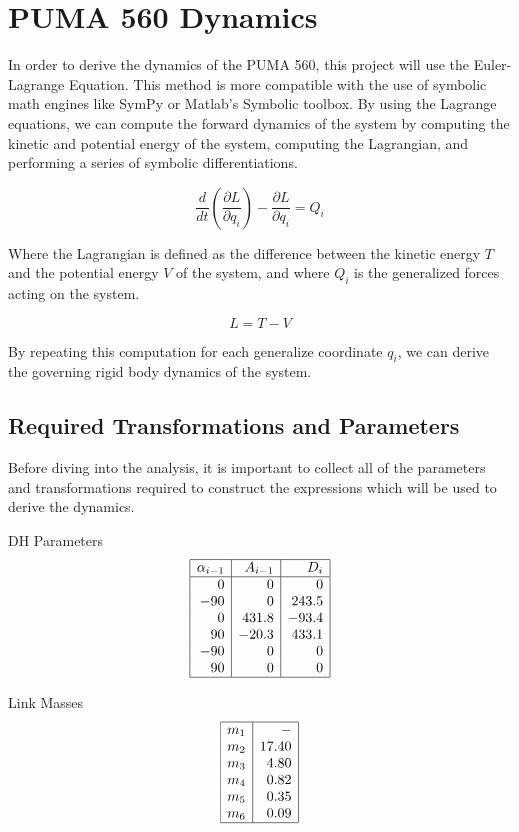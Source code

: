 \section*{PUMA 560 Dynamics}

In order to derive the dynamics of the PUMA 560, this project will use the Euler-Lagrange Equation. This method is more compatible with the use of symbolic math engines like SymPy or Matlab's Symbolic toolbox. By using the Lagrange equations, we can compute the forward dynamics of the system by computing the kinetic and potential energy of the system, computing the Lagrangian, and performing a series of symbolic differentiations.

$$
\frac{d}{d t}\left(\frac{\partial L}{\partial q_{i}}\right)-\frac{\partial L}{\partial q_{i}}=Q_{i}
$$

\noindent Where the Lagrangian is defined as the difference between the kinetic energy $T$ and the potential energy $V$ of the system, and where $Q_i$ is the generalized forces acting on the system.

$$
L = T-V
$$

\noindent By repeating this computation for each generalize coordinate $q_i$, we can derive the governing rigid body dynamics of the system.



\subsection*{Required Transformations and Parameters}

Before diving into the analysis, it is important to collect all of the parameters and transformations required to construct the expressions which will be used to derive the dynamics.

DH Parameters
$$
\begin{array}{|r|r|r|}
\hline \alpha_{i-1} & A_{i-1} & D_{i} \\
\hline 0 & 0 & 0 \\
-90 & 0 & 243.5 \\
0 & 431.8 & -93.4 \\
90 & -20.3 & 433.1 \\
-90 & 0 & 0 \\
90 & 0 & 0 \\
\hline
\end{array}
$$

Link Masses
$$
\begin{array}{|l|r|}
\hline m_{1} & - \\
m_{2} & 17.40 \\
m_{3} & 4.80 \\
m_{4} & 0.82 \\
m_{5} & 0.35 \\
m_{6} & 0.09 \\
\hline
\end{array}
$$

